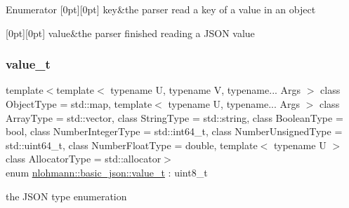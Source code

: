 \begin{DoxyEnumFields}{Enumerator}
[0pt][0pt]{}\hypertarget{classnlohmann_1_1basic__json_aea1c863b719b4ca5b77188c171bbfafea3c6e0b8a9c15224a8228b9a98ca1531d}{}\label{classnlohmann_1_1basic__json_aea1c863b719b4ca5b77188c171bbfafea3c6e0b8a9c15224a8228b9a98ca1531d} 
key&the parser read a key of a value in an object \\
\hline

[0pt][0pt]{}\hypertarget{classnlohmann_1_1basic__json_aea1c863b719b4ca5b77188c171bbfafea2063c1608d6e0baf80249c42e2be5804}{}\label{classnlohmann_1_1basic__json_aea1c863b719b4ca5b77188c171bbfafea2063c1608d6e0baf80249c42e2be5804} 
value&the parser finished reading a J\+S\+ON value \\
\hline

\end{DoxyEnumFields}
\hypertarget{classnlohmann_1_1basic__json_a231b02148577b69a154b2ce2c87a5522}{}\label{classnlohmann_1_1basic__json_a231b02148577b69a154b2ce2c87a5522} 
\subsubsection{\texorpdfstring{value\+\_\+t}{value\_t}}
{\footnotesize\ttfamily template$<$template$<$ typename U, typename V, typename... Args $>$ class Object\+Type = std\+::map, template$<$ typename U, typename... Args $>$ class Array\+Type = std\+::vector, class String\+Type  = std\+::string, class Boolean\+Type  = bool, class Number\+Integer\+Type  = std\+::int64\+\_\+t, class Number\+Unsigned\+Type  = std\+::uint64\+\_\+t, class Number\+Float\+Type  = double, template$<$ typename U $>$ class Allocator\+Type = std\+::allocator$>$ \\
enum \hyperlink{classnlohmann_1_1basic__json_a231b02148577b69a154b2ce2c87a5522}{nlohmann\+::basic\+\_\+json\+::value\+\_\+t} \+: uint8\+\_\+t\hspace{0.3cm}{\ttfamily [strong]}}



the J\+S\+ON type enumeration 

